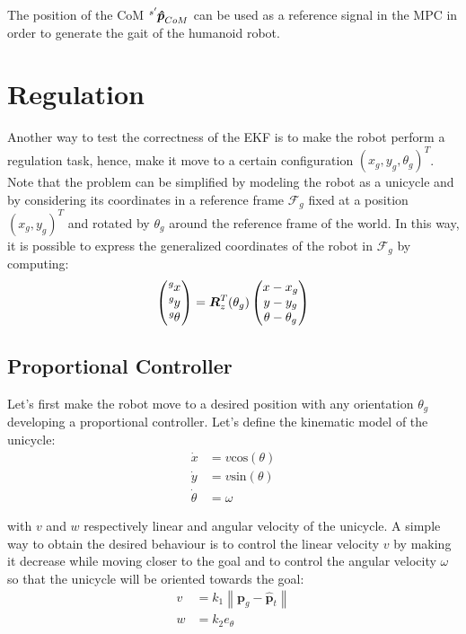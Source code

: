 \documentclass[a4paper]{article}
\begin{document}
The position of the CoM $\tensor[^{s'}]{\bm{\hat{p}}}{_{CoM}}$ can be
used as a reference signal in the MPC in order to generate the gait
of the humanoid robot.

\section{Regulation}
Another way to test the correctness of the EKF is to make the robot perform
a regulation task, hence, make it move to a certain configuration
$(x_g, y_g, \theta_g)^T$. Note that the problem can be simplified by
modeling the robot as a unicycle and by considering its coordinates
in a reference frame $\mathcal{F}_g$ fixed at a position $(x_g, y_g)^T$ and
rotated by $\theta_g$ around the reference frame of the world. In this way, it is
possible to express the generalized coordinates of the robot in $\mathcal{F}_g$
by computing:
\begin{equation}
    \begin{pmatrix}
        \tensor[^g]{x}{} \\
        \tensor[^g]{y}{} \\
        \tensor[^g]{\theta}{}
    \end{pmatrix}
        =
    \bm{R}_z^T(\theta_g)
    \begin{pmatrix}
        x - x_g \\
        y - y_g \\
        \theta - \theta_g
    \end{pmatrix}
\end{equation}

\subsection{Proportional Controller}
\label{subsec:proportional_controller}
Let's first make the robot move to a desired position with any orientation
$\theta_g$ developing a proportional controller.
Let's define the kinematic model of the unicycle:
\begin{align}
    \label{eq:kinematic-model-unicycle-xdot}
    \dot{x} &= v \text{cos}(\theta) \\
    \label{eq:kinematic-model-unicycle-ydot}
    \dot{y} &= v \text{sin}(\theta) \\
    \label{eq:kinematic-model-unicycle-thetadot}
    \dot{\theta} &= \omega
\end{align}

\noindent with $v$ and $w$ respectively linear and angular velocity of the
unicycle. A simple way to obtain the desired behaviour is to control the
linear velocity $v$ by making it decrease while moving closer to the goal and to
control the
angular velocity $\omega$ so that the unicycle
will be oriented towards the goal:
\begin{align}
    \label{eq:proportional-controller-control-law-v}
    v &= k_1 \left\| \bm{p}_g - \bm{\hat{p}}_t \right\| \\
    \label{eq:proportional-controller-control-law-w}
    w &= k_2 e_{\theta}
\end{align}
\end{document}
